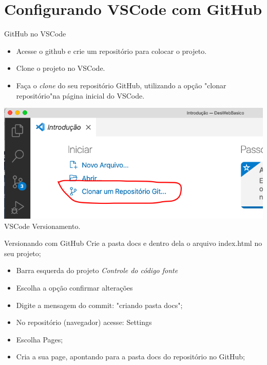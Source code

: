 \documentclass{beamer}
\begin{document}
\section{Configurando VSCode com GitHub}
\begin{frame}{GitHub no VSCode}
\begin{itemize}
  \item Acesse o github e crie um repositório para colocar o projeto.
   \item Clone o projeto no VSCode.
   \item Faça o \textit{clone} do seu repositório GitHub, utilizando a opção "clonar repositório"na página inicial do VSCode.
   \end{itemize}
       \includegraphics[height=0.4\paperheight]{fig/aula3/aula4_1.png} \\
       \tiny{VSCode Versionamento}.
     
\end{frame}
\begin{frame}{Versionando com GitHub}
Crie a pasta docs e dentro dela o arquivo index.html no seu projeto;
\begin{itemize}
   \item Barra esquerda do projeto \textit{Controle do código fonte}
   \item Escolha a opção confirmar alterações
   \item Digite a mensagem do commit: "criando pasta docs";
   \item No repositório (navegador) acesse: Settings
   \item Escolha Pages;
   \item Cria a sua page, apontando para a pasta docs do repositório no GitHub;
\end{itemize}
\end{frame}


\end{document}
